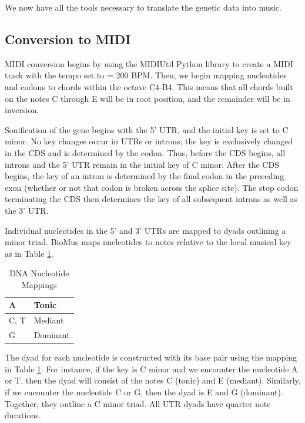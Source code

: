 \documentclass[letterpaper]{article}
\begin{document}
We now have all the tools necessary to translate the genetic data into music.

\subsection{Conversion to MIDI}

MIDI conversion begins by using the MIDIUtil Python library to create a MIDI track with the tempo set to \musQuarter = 200 BPM. Then, we begin mapping nucleotides and codons to chords within the octave C4-B4. This means that all chords built on the notes C through E will be in root position, and the remainder will be in inversion.

Sonification of the gene begins with the 5’ UTR, and the initial key is set to C minor. No key changes occur in UTRs or introns; the key is exclusively changed in the CDS and is determined by the codon. Thus, before the CDS begins, all introns and the 5’ UTR remain in the initial key of C minor. After the CDS begins, the key of an intron is determined by the final codon in the preceding exon (whether or not that codon is broken across the splice site). The stop codon terminating the CDS then determines the key of all subsequent introns as well as the 3’ UTR.


Individual nucleotides in the 5’ and 3’ UTRs are mapped to dyads outlining a minor triad. BioMus maps nucleotides to notes relative to the local musical key as in Table \ref{table:nucleotides}.

\begin{table}[h!]
\centering
\vspace{-2mm}
\begin{tabular}{|l|l|}
\hline
A   & Tonic    \\ \hline
C, T & Mediant  \\ \hline
G   & Dominant \\ \hline
\end{tabular}
\caption{DNA Nucleotide Mappings}
\vspace{-6mm}
\label{table:nucleotides}
\end{table}

The dyad for each nucleotide is constructed with its base pair using the mapping in Table \ref{table:nucleotides}. For instance, if the key is C minor and we encounter the nucleotide A or T, then the dyad will consist of the notes C (tonic) and E\musFlat\; (mediant). Similarly, if we encounter the nucleotide C or G, then the dyad is E\musFlat \; and G (dominant). Together, they outline a C minor triad. All UTR dyads have quarter note durations.
\end{document}
